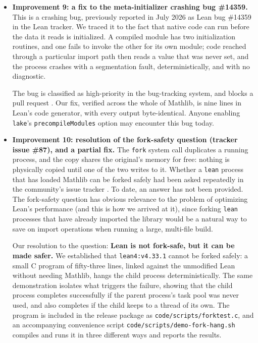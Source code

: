 \documentclass{article}
\newcommand{\Lean}{Lean\xspace}      %
\newcommand{\lean}{\texttt{lean}\xspace}      %
\newcommand{\lake}{\texttt{lake}\xspace}      %
\newcommand{\mathlib}{Mathlib\xspace}
\newcommand{\currentlean}{\texttt{lean4:v4.33.1}\xspace}
\begin{document}
\begin{itemize}

\item \textbf{Improvement 9: a fix to the meta-initializer crashing bug \#14359.}
This is a crashing bug, previously reported in July 2026 as \Lean bug \#14359 in the \Lean tracker.  
\cite{lean14359}
We traced it to the fact that native code can run before the data it reads is initialized.
A compiled module has two initialization routines, and one fails to invoke
the other for its own module; code reached through a particular import path
then reads a value that was never set, and the process crashes with a
segmentation fault, deterministically, and with no diagnostic. 

The bug is classified as high-priority in the bug-tracking system, and blocks a pull request \cite{lean14326}.
Our fix, verified across the whole of \mathlib, is nine lines in \Lean's code generator, with every output byte-identical. 
Anyone enabling \lake's \texttt{precompileModules} option may encounter this bug today.

\item \textbf{Improvement 10: resolution of the fork-safety question (tracker issue \#87), and a partial fix.}
The \texttt{fork} system call duplicates a running process, and the copy shares the original's memory for free: nothing is physically copied until one of the two writes to it. Whether a \lean process that has loaded \mathlib can be forked safely had been asked repeatedly in the community's issue tracker \cite{repl87,repl84}. To date, an answer has not been provided. The fork-safety question has obvious relevance to the problem of optimizing \Lean's performance (and this is how we arrived at it), since forking \lean processes that have already imported the library would be a natural way to save on import operations when running a large, multi-file build.

Our resolution to the question: \textbf{\Lean is not fork-safe, but it can be made safer.} We established that \currentlean cannot be forked safely: a small C program of fifty-three lines, linked against the unmodified \Lean without needing \mathlib, hangs the child process deterministically. The same demonstration isolates what triggers the failure, showing that the child process completes successfully if the parent process's task pool was never used, and also completes if the child keeps to a thread of its own. The program is included in the release package as \texttt{code/scripts/\allowbreak forktest.c}, and an accompanying convenience script \texttt{code/scripts/\allowbreak demo-fork-hang.sh} compiles and runs it in three different ways and reports the results.


\end{itemize}
\end{document}
